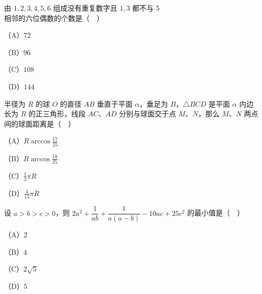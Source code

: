 \begin{question}
由 $1,2,3,4,5,6$ 组成没有重复数字且 $1,3$ 都不与 $5$ 相邻的六位偶数的个数是（　）

（A）$72$

（B）$96$

（C）$108$

（D）$144$

\Needspace{0.4\textheight}
\end{question}
\begingroup
\renewenvironment{question}{\Needspace{0.5\textheight}}{}
\begin{question}
半径为 $R$ 的球 $O$ 的直径 $AB$ 垂直于平面 $\alpha$，垂足为 $B$，$\triangle BCD$ 是平面 $\alpha$ 内边长为 $R$ 的正三角形，线段 $AC$、$AD$ 分别与球面交于点 $M$、$N$，那么 $M$、$N$ 两点间的球面距离是（　）
\nopagebreak[4]
\begin{center}\end{center}
\nopagebreak[4]
（A）$R\arccos\frac{17}{25}$

（B）$R\arccos\frac{18}{25}$

（C）$\frac{1}{3}\pi R$

（D）$\frac{4}{15}\pi R$

\end{question}
\endgroup
\begin{question}
设 $a>b>c>0$，则 $2a^2+\dfrac{1}{ab}+\dfrac{1}{a(a-b)}-10ac+25c^2$ 的最小值是（　）

（A）$2$

（B）$4$

（C）$2\sqrt5$

（D）$5$

\end{question}

